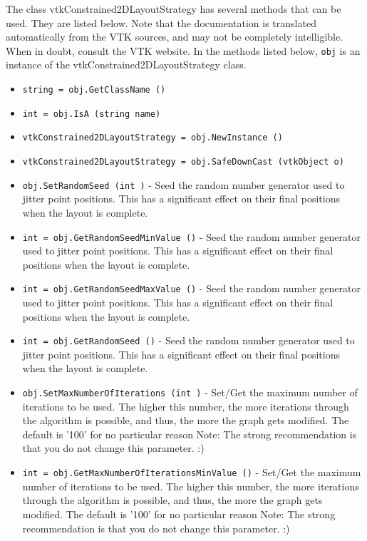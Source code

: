 The class vtkConstrained2DLayoutStrategy has several methods that can be used.
  They are listed below.
Note that the documentation is translated automatically from the VTK sources,
and may not be completely intelligible.  When in doubt, consult the VTK website.
In the methods listed below, \verb|obj| is an instance of the vtkConstrained2DLayoutStrategy class.
\begin{itemize}
\item  \verb|string = obj.GetClassName ()|

\item  \verb|int = obj.IsA (string name)|

\item  \verb|vtkConstrained2DLayoutStrategy = obj.NewInstance ()|

\item  \verb|vtkConstrained2DLayoutStrategy = obj.SafeDownCast (vtkObject o)|

\item  \verb|obj.SetRandomSeed (int )| -  Seed the random number generator used to jitter point positions.
 This has a significant effect on their final positions when
 the layout is complete.

\item  \verb|int = obj.GetRandomSeedMinValue ()| -  Seed the random number generator used to jitter point positions.
 This has a significant effect on their final positions when
 the layout is complete.

\item  \verb|int = obj.GetRandomSeedMaxValue ()| -  Seed the random number generator used to jitter point positions.
 This has a significant effect on their final positions when
 the layout is complete.

\item  \verb|int = obj.GetRandomSeed ()| -  Seed the random number generator used to jitter point positions.
 This has a significant effect on their final positions when
 the layout is complete.

\item  \verb|obj.SetMaxNumberOfIterations (int )| -  Set/Get the maximum number of iterations to be used.
 The higher this number, the more iterations through the algorithm
 is possible, and thus, the more the graph gets modified.
 The default is '100' for no particular reason
 Note: The strong recommendation is that you do not change
 this parameter. :)

\item  \verb|int = obj.GetMaxNumberOfIterationsMinValue ()| -  Set/Get the maximum number of iterations to be used.
 The higher this number, the more iterations through the algorithm
 is possible, and thus, the more the graph gets modified.
 The default is '100' for no particular reason
 Note: The strong recommendation is that you do not change
 this parameter. :)


\end{itemize}
